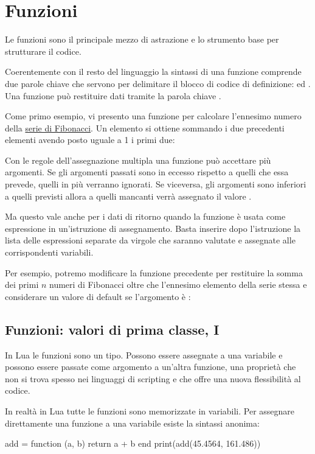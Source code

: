
\chapter{Funzioni}

Le funzioni sono il principale mezzo di astrazione e lo strumento base per
strutturare il codice.

Coerentemente con il resto del linguaggio la sintassi di una funzione comprende
due parole chiave che servono per delimitare il blocco di codice di
definizione:  ed . Una funzione può restituire dati
tramite la parola chiave .

Come primo esempio, vi presento una funzione per calcolare l'ennesimo numero
della \href{http://it.wikipedia.org/wiki/Successione_di_Fibonacci}{serie di
Fibonacci}. Un elemento si ottiene sommando i due precedenti elementi avendo
posto uguale a 1 i primi due:

Con le regole dell'assegnazione multipla una funzione può accettare più
argomenti. Se gli argomenti passati sono in eccesso rispetto a quelli che essa
prevede, quelli in più verranno ignorati. Se viceversa, gli argomenti sono
inferiori a quelli previsti allora a quelli mancanti verrà assegnato il valore
.

Ma questo vale anche per i dati di ritorno quando la funzione è usata come
espressione in un'istruzione di assegnamento. Basta inserire dopo l'istruzione
 la lista delle espressioni separate da virgole che saranno valutate
e assegnate alle corrispondenti variabili.

Per esempio, potremo modificare la funzione precedente per restituire la somma
dei primi \( n \) numeri di Fibonacci oltre che l'ennesimo elemento della serie
stessa e considerare un valore di default se l'argomento è :


\section{Funzioni: valori di prima classe, I}

In Lua le funzioni sono un tipo. Possono essere assegnate a una variabile e
possono essere passate come argomento a un'altra funzione, una proprietà che
non si trova spesso nei linguaggi di scripting e che offre una nuova
flessibilità al codice.

In realtà in Lua tutte le funzioni sono memorizzate in variabili. Per assegnare
direttamente una funzione a una variabile esiste la sintassi anonima:
\begin{lines}
add = function (a, b)
    return a + b
end
print(add(45.4564, 161.486))
\end{lines}

